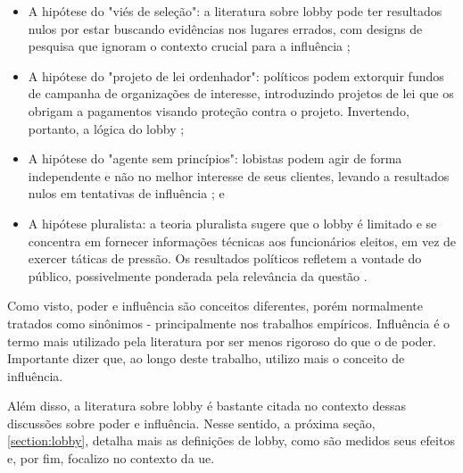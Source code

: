 \begin{itemize}
    \item  A hipótese do "viés de seleção": a literatura sobre lobby pode ter resultados nulos por estar buscando evidências nos lugares errados, com designs de pesquisa que ignoram o contexto crucial para a influência \cite{baumgartner1998basic};
    \item A hipótese do "projeto de lei ordenhador": políticos podem extorquir fundos de campanha de organizações de interesse, introduzindo projetos de lei que os obrigam a pagamentos visando proteção contra o projeto. Invertendo, portanto, a lógica do lobby \cite{mueller1986interest, coughlin1990electoral, shughart1986growth};
    \item A hipótese do "agente sem princípios": lobistas podem agir de forma independente e não no melhor interesse de seus clientes, levando a resultados nulos em tentativas de influência \cite{kersh2002, stephenson2010lobbyists}; e
    \item A hipótese pluralista: a teoria pluralista sugere que o lobby é limitado e se concentra em fornecer informações técnicas aos funcionários eleitos, em vez de exercer táticas de pressão. Os resultados políticos refletem a vontade do público, possivelmente ponderada pela relevância da questão \cite{dahl2005governs}.
\end{itemize}

Como visto, poder e influência são conceitos diferentes, porém normalmente tratados como sinônimos - principalmente nos trabalhos empíricos. Influência é o termo mais utilizado pela literatura por ser menos rigoroso do que o de poder. Importante dizer que, ao longo deste trabalho, utilizo mais o conceito de influência.

Além disso, a literatura sobre lobby é bastante citada no contexto dessas discussões sobre poder e influência. Nesse sentido, a próxima seção, \ref{section:lobby}, detalha mais as definições de lobby, como são medidos seus efeitos e, por fim, focalizo no contexto da \acrshort{ue}.